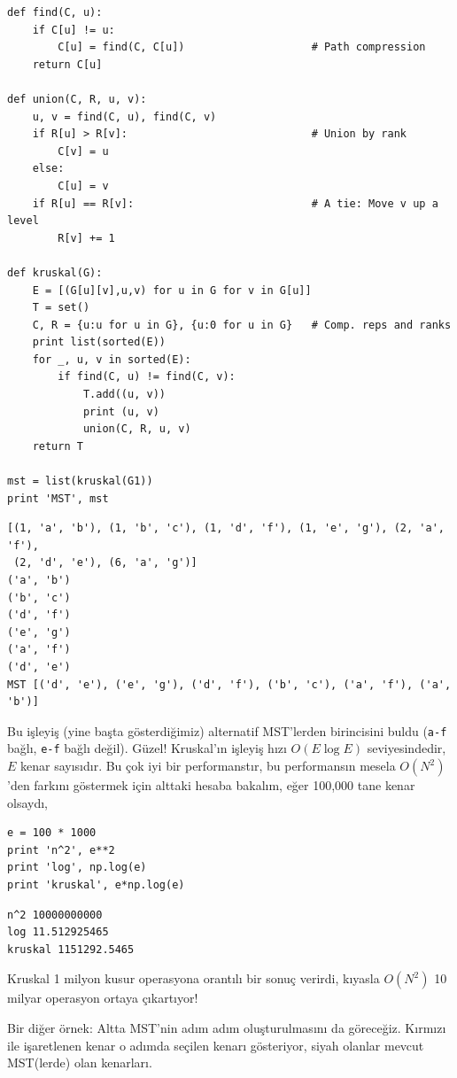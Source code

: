 \documentclass[12pt,fleqn]{article}\usepackage{../../common}
\begin{document}
\begin{verbatim}
def find(C, u):
    if C[u] != u:
        C[u] = find(C, C[u])                    # Path compression
    return C[u]

def union(C, R, u, v):
    u, v = find(C, u), find(C, v)
    if R[u] > R[v]:                             # Union by rank
        C[v] = u
    else:
        C[u] = v
    if R[u] == R[v]:                            # A tie: Move v up a level
        R[v] += 1

def kruskal(G):
    E = [(G[u][v],u,v) for u in G for v in G[u]]
    T = set()
    C, R = {u:u for u in G}, {u:0 for u in G}   # Comp. reps and ranks
    print list(sorted(E))
    for _, u, v in sorted(E):
        if find(C, u) != find(C, v):
            T.add((u, v))
            print (u, v)
            union(C, R, u, v)
    return T

mst = list(kruskal(G1))
print 'MST', mst
\end{verbatim}

\begin{verbatim}
[(1, 'a', 'b'), (1, 'b', 'c'), (1, 'd', 'f'), (1, 'e', 'g'), (2, 'a', 'f'),
 (2, 'd', 'e'), (6, 'a', 'g')]
('a', 'b')
('b', 'c')
('d', 'f')
('e', 'g')
('a', 'f')
('d', 'e')
MST [('d', 'e'), ('e', 'g'), ('d', 'f'), ('b', 'c'), ('a', 'f'), ('a', 'b')]
\end{verbatim}

Bu işleyiş (yine başta gösterdiğimiz) alternatif MST'lerden birincisini
buldu (\verb!a-f! bağlı, \verb!e-f! bağlı değil). Güzel! Kruskal'ın işleyiş
hızı $O(E \log E)$ seviyesindedir, $E$ kenar sayısıdır. Bu çok iyi bir
performanstır, bu performansın mesela $O(N^2)$'den farkını göstermek için
alttaki hesaba bakalım, eğer 100,000 tane kenar olsaydı,

\begin{verbatim}
e = 100 * 1000
print 'n^2', e**2
print 'log', np.log(e)
print 'kruskal', e*np.log(e)
\end{verbatim}

\begin{verbatim}
n^2 10000000000
log 11.512925465
kruskal 1151292.5465
\end{verbatim}

Kruskal 1 milyon kusur operasyona orantılı bir sonuç verirdi, kıyasla
$O(N^2)$ 10 milyar operasyon ortaya çıkartıyor! 

Bir diğer örnek: Altta MST'nin adım adım oluşturulmasını da
göreceğiz. Kırmızı ile işaretlenen kenar o adımda seçilen kenarı
gösteriyor, siyah olanlar mevcut MST(lerde) olan kenarları.
\end{document}
